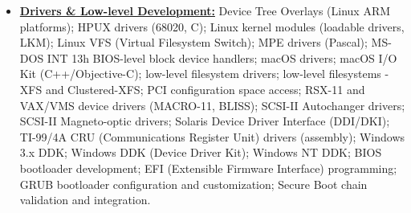 \documentclass[letterpaper,11pt]{article}
\begin{document}
{\begin{itemize}[leftmargin=0.1in, label={}, itemsep=0pt, parsep=0pt, topsep=0pt, partopsep=0pt]
\item
\textbf{\underline{Drivers \& Low-level Development:}} \hspace{0pt}
Device Tree Overlays (Linux ARM platforms);
HPUX drivers (68020, C);
Linux kernel modules (loadable drivers, LKM);
Linux VFS (Virtual Filesystem Switch);
MPE drivers (Pascal);
MS-DOS INT 13h BIOS-level block device handlers;
macOS drivers;
macOS I/O Kit (C++/Objective-C);
low-level filesystem drivers;
low-level filesystems - XFS and Clustered-XFS;
PCI configuration space access;
RSX-11 and VAX/VMS device drivers (MACRO-11, BLISS);
SCSI-II Autochanger drivers;
SCSI-II Magneto-optic drivers;
Solaris Device Driver Interface (DDI/DKI);
TI-99/4A CRU (Communications Register Unit) drivers (assembly);
Windows 3.x DDK;
Windows DDK (Device Driver Kit);
Windows NT DDK;
BIOS bootloader development;
EFI (Extensible Firmware Interface) programming;
GRUB bootloader configuration and customization;
Secure Boot chain validation and integration.


\end{itemize}}
\end{document}
